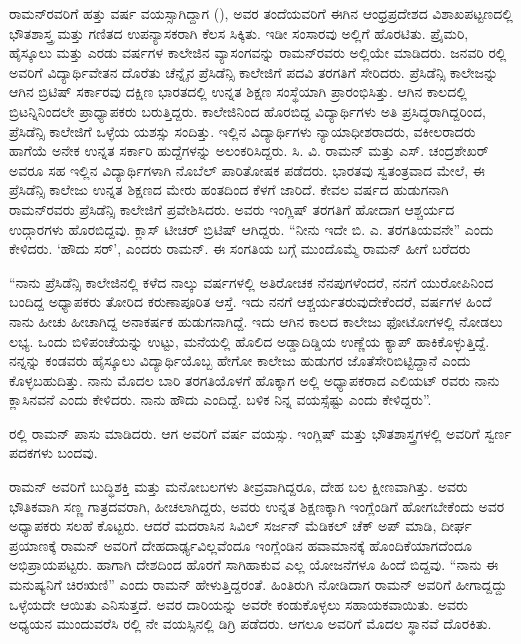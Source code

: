 ರಾಮನ್‍ರವರಿಗೆ ಹತ್ತು ವರ್ಷ ವಯಸ್ಸಾಗಿದ್ದಾಗ (), ಅವರ ತಂದೆಯವರಿಗೆ ಈಗಿನ ಆಂಧ್ರಪ್ರದೇಶದ ವಿಶಾಖಪಟ್ಟಣದಲ್ಲಿ ಭೌತಶಾಸ್ತ್ರ ಮತ್ತು ಗಣಿತದ ಉಪನ್ಯಾಸಕರಾಗಿ ಕೆಲಸ ಸಿಕ್ಕಿತು. ಇಡೀ ಸಂಸಾರವು ಅಲ್ಲಿಗೆ ಹೊರಟಿತು. ಪ್ರೈಮರಿ, ಹೈಸ್ಕೂಲು ಮತ್ತು ಎರಡು ವರ್ಷಗಳ ಕಾಲೇಜಿನ ವ್ಯಾಸಂಗವನ್ನು ರಾಮನ್‍ರವರು ಅಲ್ಲಿಯೇ ಮಾಡಿದರು. ಜನವರಿ ರಲ್ಲಿ ಅವರಿಗೆ ವಿದ್ಯಾರ್ಥಿವೇತನ ದೊರೆತು ಚೆನ್ನೈನ ಪ್ರೆಸಿಡೆನ್ಸಿ ಕಾಲೇಜಿಗೆ ಪದವಿ ತರಗತಿಗೆ ಸೇರಿದರು. ಪ್ರೆಸಿಡೆನ್ಸಿ ಕಾಲೇಜನ್ನು ಆಗಿನ ಬ್ರಿಟಿಷ್ ಸರ್ಕಾರವು ದಕ್ಷಿಣ ಭಾರತದಲ್ಲಿ ಉನ್ನತ ಶಿಕ್ಷಣ ಸಂಸ್ಥೆಯಾಗಿ ಪ್ರಾರಂಭಿಸಿತ್ತು. ಆಗಿನ ಕಾಲದಲ್ಲಿ ಬ್ರಿಟನ್ನಿನಿಂದಲೇ ಪ್ರಾಧ್ಯಾಪಕರು ಬರುತ್ತಿದ್ದರು. ಕಾಲೇಜಿನಿಂದ ಹೊರಬಿದ್ದ ವಿದ್ಯಾರ್ಥಿಗಳು ಅತಿ ಪ್ರಸಿದ್ಧರಾಗಿದ್ದರಿಂದ, ಪ್ರೆಸಿಡೆನ್ಸಿ ಕಾಲೇಜಿಗೆ ಒಳ್ಳೆಯ ಯಶಸ್ಸು ಸಂದಿತ್ತು. ಇಲ್ಲಿನ ವಿದ್ಯಾರ್ಥಿಗಳು ನ್ಯಾಯಾಧೀಶರಾದರು, ವಕೀಲರಾದರು ಹಾಗೆಯೆ ಅನೇಕ ಉನ್ನತ ಸರ್ಕಾರಿ ಹುದ್ದೆಗಳನ್ನು ಅಲಂಕರಿಸಿದ್ದರು. ಸಿ. ವಿ. ರಾಮನ್ ಮತ್ತು ಎಸ್. ಚಂದ್ರಶೇಖರ್ ಅವರೂ ಸಹ ಇಲ್ಲಿನ ವಿದ್ಯಾರ್ಥಿಗಳಾಗಿ ನೊಬೆಲ್ ಪಾರಿತೋಷಕ ಪಡೆದರು. ಭಾರತವು ಸ್ವತಂತ್ರವಾದ ಮೇಲೆ, ಈ ಪ್ರೆಸಿಡೆನ್ಸಿ ಕಾಲೇಜು ಉನ್ನತ ಶಿಕ್ಷಣದ ಮೇರು ಹಂತದಿಂದ ಕೆಳಗೆ ಜಾರಿದೆ. ಕೇವಲ  ವರ್ಷದ ಹುಡುಗನಾಗಿ ರಾಮನ್‍ರವರು ಪ್ರೆಸಿಡೆನ್ಸಿ ಕಾಲೇಜಿಗೆ ಪ್ರವೇಶಿಸಿದರು. ಅವರು ಇಂಗ್ಲಿಷ್ ತರಗತಿಗೆ ಹೋದಾಗ ಆಶ್ಚರ್ಯದ ಉದ್ಗಾರಗಳು ಹೊರಬಿದ್ದವು. ಕ್ಲಾಸ್ ಟೀಚರ್ ಬ್ರಿಟಿಷ್ ಆಗಿದ್ದರು. “ನೀನು ಇದೇ ಬಿ. ಎ. ತರಗತಿಯವನೇ” ಎಂದು ಕೇಳಿದರು. ‘ಹೌದು ಸರ್’, ಎಂದರು ರಾಮನ್. ಈ ಸಂಗತಿಯ ಬಗ್ಗೆ ಮುಂದೊಮ್ಮೆ ರಾಮನ್ ಹೀಗೆ ಬರೆದರು

“ನಾನು ಪ್ರೆಸಿಡೆನ್ಸಿ ಕಾಲೇಜಿನಲ್ಲಿ ಕಳೆದ ನಾಲ್ಕು ವರ್ಷಗಳಲ್ಲಿ ಅತಿರೋಚಕ ನೆನಪುಗಳೆಂದರೆ, ನನಗೆ ಯುರೋಪಿನಿಂದ ಬಂದಿದ್ದ ಅಧ್ಯಾಪಕರು ತೋರಿದ ಕರುಣಾಪೂರಿತ ಆಸ್ತೆ. ಇದು ನನಗೆ ಆಶ್ಚರ್ಯತರುವುದೇಕೆಂದರೆ,  ವರ್ಷಗಳ ಹಿಂದೆ ನಾನು ಹೀಚು  ಹೀಚಾಗಿದ್ದ ಅನಾಕರ್ಷಕ ಹುಡುಗನಾಗಿದ್ದೆ. ಇದು ಆಗಿನ ಕಾಲದ ಕಾಲೇಜು ಫೋಟೋಗಳಲ್ಲಿ ನೋಡಲು ಲಭ್ಯ. ಒಂದು ಬಿಳಿಪಂಚೆಯನ್ನು ಉಟ್ಟು, ಮನೆಯಲ್ಲಿ ಹೊಲಿದ ಅಡ್ಡಾದಿಡ್ಡಿಯ ಉಣ್ಣೆಯ ಕ್ಯಾಪ್ ಹಾಕಿಕೊಳ್ಳುತ್ತಿದ್ದೆ. ನನ್ನನ್ನು ಕಂಡವರು ಹೈಸ್ಕೂಲು ವಿದ್ಯಾರ್ಥಿಯೊಬ್ಬ ಹೇಗೋ ಕಾಲೇಜು ಹುಡುಗರ ಜೊತೆ\break ಸೇರಿಬಿಟ್ಟಿದ್ದಾನೆ ಎಂದು ಕೊಳ್ಳಬಹುದಿತ್ತು. ನಾನು ಮೊದಲ ಬಾರಿ ತರಗತಿಯೊಳಗೆ ಹೊಕ್ಕಾಗ ಅಲ್ಲಿ ಅಧ್ಯಾಪಕರಾದ  ಎಲಿಯಟ್ ರವರು ನಾನು  ಕ್ಲಾಸಿನವನೆ ಎಂದು ಕೇಳಿದರು. ನಾನು ಹೌದು ಎಂದಿದ್ದೆ. ಬಳಿಕ ನಿನ್ನ ವಯಸ್ಸೆಷ್ಟು ಎಂದು ಕೇಳಿದ್ದರು”.

ರಲ್ಲಿ ರಾಮನ್  ಪಾಸು ಮಾಡಿದರು. ಆಗ ಅವರಿಗೆ  ವರ್ಷ ವಯಸ್ಸು. ಇಂಗ್ಲಿಷ್ ಮತ್ತು ಭೌತಶಾಸ್ತ್ರಗಳಲ್ಲಿ ಅವರಿಗೆ ಸ್ವರ್ಣ ಪದಕಗಳು ಬಂದವು.

ರಾಮನ್ ಅವರಿಗೆ ಬುದ್ಧಿಶಕ್ತಿ ಮತ್ತು ಮನೋಬಲಗಳು ತೀವ್ರವಾಗಿದ್ದರೂ, ದೇಹ ಬಲ ಕ್ಷೀಣವಾಗಿತ್ತು. ಅವರು ಭೌತಿಕವಾಗಿ ಸಣ್ಣ ಗಾತ್ರದವರಾಗಿ, ಹೀಚಲಾಗಿದ್ದರು, ಅವರು ಉನ್ನತ ಶಿಕ್ಷಣಕ್ಕಾಗಿ ಇಂಗ್ಲೆಂಡಿಗೆ ಹೋಗಬೇಕೆಂದು ಅವರ ಅಧ್ಯಾಪಕರು ಸಲಹೆ ಕೊಟ್ಟರು. ಆದರೆ ಮದರಾಸಿನ ಸಿವಿಲ್ ಸರ್ಜನ್ ಮೆಡಿಕಲ್ ಚೆಕ್ ಅಪ್ ಮಾಡಿ, ದೀರ್ಘ ಪ್ರಯಾಣಕ್ಕೆ ರಾಮನ್ ಅವರಿಗೆ ದೇಹದಾರ್ಢ್ಯವಿಲ್ಲವೆಂದೂ ಇಂಗ್ಲೆಂಡಿನ ಹವಾಮಾನಕ್ಕೆ ಹೊಂದಿಕೆಯಾಗದೆಂದೂ ಅಭಿಪ್ರಾಯಪಟ್ಟರು. ಹಾಗಾಗಿ ದೇಶದಿಂದ ಹೊರಗೆ ಸಾಗಿಹಾಕುವ ಎಲ್ಲ ಯೋಜನೆಗಳೂ ಹಿಂದೆ ಬಿದ್ದವು. “ನಾನು ಈ ಮನುಷ್ಯನಿಗೆ ಚಿರಋಣಿ” ಎಂದು ರಾಮನ್ ಹೇಳುತ್ತಿದ್ದರಂತೆ. ಹಿಂತಿರುಗಿ ನೋಡಿದಾಗ ರಾಮನ್ ಅವರಿಗೆ ಹೀಗಾದ್ದದ್ದು ಒಳ್ಳೆಯದೇ ಆಯಿತು ಎನಿಸುತ್ತದೆ. ಅವರ ದಾರಿಯನ್ನು ಅವರೇ ಕಂಡುಕೊಳ್ಳಲು ಸಹಾಯಕವಾಯಿತು. ಅವರು ಅಧ್ಯಯನ ಮುಂದುವರೆಸಿ ರಲ್ಲಿ ನೇ ವಯಸ್ಸಿನಲ್ಲಿ  ಡಿಗ್ರಿ ಪಡೆದರು. ಆಗಲೂ ಅವರಿಗೆ ಮೊದಲ ಸ್ಥಾನವೆ ದೊರಕಿತು.


